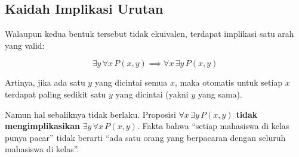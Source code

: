 \subsection{Kaidah Implikasi Urutan}

Walaupun kedua bentuk tersebut tidak ekuivalen, terdapat implikasi satu arah yang valid:

\[ \exists y \, \forall x \, P(x,y) \implies \forall x \, \exists y \, P(x,y) \]

Artinya, jika ada satu $y$ yang dicintai semua $x$, maka otomatis untuk setiap $x$ terdapat paling sedikit satu $y$ yang dicintai (yakni $y$ yang sama).

Namun hal sebaliknya tidak berlaku. Proposisi $\forall x \, \exists y \, P(x,y)$ \textbf{tidak mengimplikasikan} $\exists y \, \forall x \, P(x,y)$. Fakta bahwa ``setiap mahasiswa di kelas punya pacar'' tidak berarti ``ada satu orang yang berpacaran dengan seluruh mahasiswa di kelas''.
